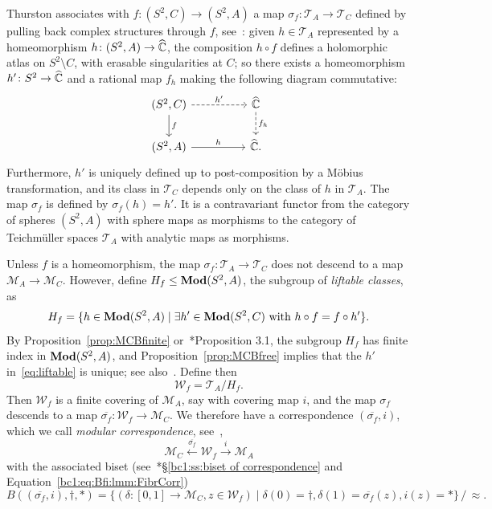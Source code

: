 \documentclass{amsart}
\begin{document}
Thurston associates with $f\colon(S^2,C)\to(S^2,A)$ a map
$\sigma_f\colon\mathscr T_A\to\mathscr T_C$ defined by pulling back
complex structures through $f$, see~\cite{douady-h:thurston}: given
$h\in\mathscr T_A$ represented by a homeomorphism
$h\colon(S^2,A)\to{\widehat{{\mathbb C}}}$, the composition $h\circ f$ defines a
holomorphic atlas on $S^2\setminus C$, with erasable singularities at
$C$; so there exists a homeomorphism $h'\colon S^2\to{\widehat{{\mathbb C}}}$ and a
rational map $f_h$ making the following diagram commutative:
\begin{equation}\label{eq:h'}
  \begin{tikzcd}
    (S^2,C)\arrow[dashed]{rr}{h'}\dar{f} & & \hC\arrow[dashed]{d}{f_h}\\
    (S^2,A)\arrow{rr}{h} & & \hC.
  \end{tikzcd}
\end{equation}
Furthermore, $h'$ is uniquely defined up to post-composition by a
M\"obius transformation, and its class in $\mathscr T_C$ depends only
on the class of $h$ in $\mathscr T_A$. The map $\sigma_f$ is defined
by $\sigma_f(h)=h'$. It is a contravariant functor from the category
of spheres $(S^2,A)$ with sphere maps as morphisms to the category of
Teichm\"uller spaces $\mathscr T_A$ with analytic maps as morphisms.

Unless $f$ is a homeomorphism, the map
$\sigma_f\colon\mathscr T_A\to\mathscr T_C$ does not descend to a map
$\mathscr M_A\to\mathscr M_C$. However, define $H_f\le\mathbf{\relax Mod}(S^2,A)$,
the subgroup of \emph{liftable classes}, as
\begin{equation}\label{eq:liftable}
  H_f=\{h\in\mathbf{\relax Mod}(S^2,A)\mid \exists h'\in\mathbf{\relax Mod}(S^2,C)\text{ with
}h\circ f=f\circ h'\}.
\end{equation}
By Proposition~\ref{prop:MCBfinite}
or~\cite{koch-pilgrim-selinger:pullback}*{Proposition 3.1}, the
subgroup $H_f$ has finite index in $\mathbf{\relax Mod}(S^2,A)$, and
Proposition~\ref{prop:MCBfree} implies that the $h'$
in~\eqref{eq:liftable} is unique; see
also~\cite{bartholdi-buff:compactification}. Define then
\[\mathscr W_f=\mathscr T_A/H_f.\]
Then $\mathscr W_f$ is a finite covering of $\mathscr M_A$, say with
covering map $i$, and the map $\sigma_f$ descends to a map
$\overline{\sigma_f}\colon\mathscr W_f\to\mathscr M_C$. We therefore
have a correspondence $(\overline{\sigma_f},i)$, which we call
\emph{modular correspondence}, see~\cite{koch:teichmuller-cfe},
\begin{equation}\label{eq:thurston correspondence}
\mathscr M_C
\overset{\overline{\sigma_f}}\longleftarrow
\mathscr W_f \overset i\longrightarrow  \mathscr M_A
\end{equation}
with the associated biset
(see~\cite{bartholdi-dudko:bc1}*{\S\ref{bc1:ss:biset of
    correspondence} and Equation~\eqref{bc1:eq:Bfi:lmm:FibrCorr}})
\begin{equation}
\label{eq:def:bis:MapClassCorr}
  B((\overline{\sigma_f},i), \dagger,*)=\{(\delta\colon[0,1]\to \mathscr M_C,z\in \mathscr W_f) \mid\delta(0)=\dagger, \delta(1)=\overline{\sigma_f}(z), i(z)=*\}\,/\,{\approx}.
\end{equation}
\end{document}
